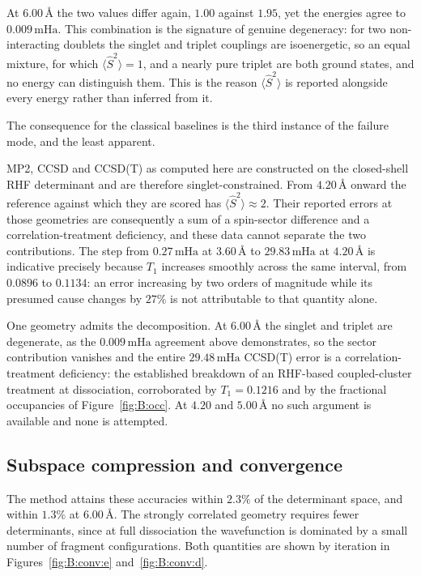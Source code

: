 \documentclass[11pt,a4paper]{article}
\newcommand{\mHa}{\ensuremath{\,\mathrm{mHa}}}
\newcommand{\Ang}{\ensuremath{\,\text{\AA}}}
\newcommand{\Ssq}{\ensuremath{\langle \hat{S}^2 \rangle}}
\begin{document}
At $6.00\Ang$ the two values differ again, $1.00$ against $1.95$, yet the
energies agree to $0.009\mHa$. This combination is the signature of genuine
degeneracy: for two non-interacting doublets the singlet and triplet couplings
are isoenergetic, so an equal mixture, for which $\Ssq = 1$, and a nearly pure
triplet are both ground states, and no energy can distinguish them. This is the
reason $\Ssq$ is reported alongside every energy rather than inferred from it.

The consequence for the classical baselines is the third instance of the
failure mode, and the least apparent.

\begin{result}
MP2, CCSD and CCSD(T) as computed here are constructed on the closed-shell RHF
determinant and are therefore singlet-constrained. From $4.20\Ang$ onward the
reference against which they are scored has $\Ssq \approx 2$. Their reported
errors at those geometries are consequently a sum of a spin-sector difference
and a correlation-treatment deficiency, and these data cannot separate the two
contributions. The step from $0.27\mHa$ at $3.60\Ang$ to $29.83\mHa$ at
$4.20\Ang$ is indicative precisely because $T_1$ increases smoothly across the
same interval, from $0.0896$ to $0.1134$: an error increasing by two orders of
magnitude while its presumed cause changes by $27\%$ is not attributable to
that quantity alone.
\end{result}

One geometry admits the decomposition. At $6.00\Ang$ the singlet and triplet
are degenerate, as the $0.009\mHa$ agreement above demonstrates, so the sector
contribution vanishes and the entire $29.48\mHa$ CCSD(T) error is a
correlation-treatment deficiency: the established breakdown of an RHF-based
coupled-cluster treatment at dissociation, corroborated by $T_1 = 0.1216$ and
by the fractional occupancies of Figure~\ref{fig:B:occ}. At $4.20$ and
$5.00\Ang$ no such argument is available and none is attempted.

\subsection{Subspace compression and convergence}

The method attains these accuracies within $2.3\%$ of the determinant space,
and within $1.3\%$ at $6.00\Ang$. The strongly correlated geometry requires
fewer determinants, since at full dissociation the wavefunction is dominated by
a small number of fragment configurations. Both quantities are shown by
iteration in Figures~\ref{fig:B:conv:e} and~\ref{fig:B:conv:d}.
\end{document}
